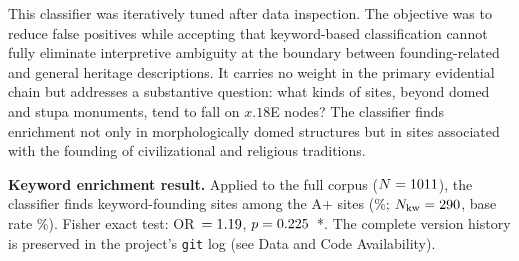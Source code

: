 \documentclass[HARVARD,twocolumn]{USG}
\begin{document}
This classifier was iteratively tuned after data inspection. The
objective was to reduce false positives while accepting that keyword-based
classification cannot fully eliminate interpretive ambiguity at
the boundary between founding-related and general heritage
descriptions. It carries no weight in the primary evidential
chain but addresses a substantive question: what kinds of sites,
beyond domed and stupa monuments, tend to fall on $x.18$\textdegree{}E
nodes? The classifier finds enrichment not only in morphologically
domed structures but in sites associated with the founding of
civilizational and religious traditions.

\textbf{Keyword enrichment result.}
Applied to the full corpus ($N = 1011$), the classifier finds
\NfoundKwAp{} keyword-founding sites among the \NclusterAp{} A+ sites
(\foundKwApRate\%; $N_{\mathrm{kw}} = 290$, base rate
\foundKwBaseRate\%). Fisher exact test: OR~$= 1.19$,
$p = 0.225$~*. The complete version history is preserved in
the project's \texttt{git} log (see Data and Code Availability).



\end{document}
